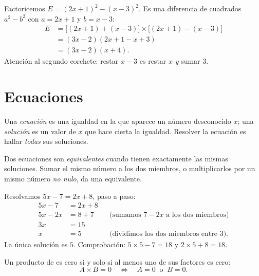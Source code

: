 \begin{example}\label{ex:g10:algebra:factorsteps}
Factoricemos $E = (2x + 1)^2 - (x - 3)^2$. Es una diferencia de cuadrados
$a^2 - b^2$ con $a = 2x+1$ y $b = x-3$:
\begin{align*}
E &= \bigl[(2x+1) + (x-3)\bigr] \times \bigl[(2x+1) - (x-3)\bigr] \\
  &= (3x - 2)(2x + 1 - x + 3) \\
  &= (3x - 2)(x + 4).
\end{align*}
Atención al segundo corchete: restar $x - 3$ es restar $x$ \emph{y} sumar
$3$.
\end{example}

\section{Ecuaciones}

\begin{definition}\label{def:g10:algebra:equation}
Una \emph{ecuación} es una igualdad en la que aparece un
número desconocido $x$; una \emph{solución} es un valor de $x$ que hace
cierta la igualdad. Resolver la ecuación es hallar \emph{todas} sus
soluciones.
\end{definition}

Dos ecuaciones son \emph{equivalentes} cuando tienen exactamente las
mismas soluciones. Sumar el mismo número a los dos miembros, o
multiplicarlos por un mismo número \emph{no nulo}, da una 
equivalente.

\begin{example}\label{ex:g10:algebra:firstdegree}
Resolvamos $5x - 7 = 2x + 8$, paso a paso:
\begin{align*}
5x - 7 &= 2x + 8 \\
5x - 2x &= 8 + 7 && \text{(sumamos $7 - 2x$ a los dos miembros)} \\
3x &= 15 \\
x &= 5 && \text{(dividimos los dos miembros entre $3$).}
\end{align*}
La única solución es $5$. Comprobación: $5 \times 5 - 7 = 18$ y
$2 \times 5 + 8 = 18$.
\end{example}

\begin{theorem}\label{thm:g10:algebra:zeroproduct}
Un producto de  es cero si y solo si al menos uno de sus
factores es cero:
\[
A \times B = 0
\quad\Longleftrightarrow\quad
A = 0 \ \text{ o } \ B = 0 .
\]
\end{theorem}


